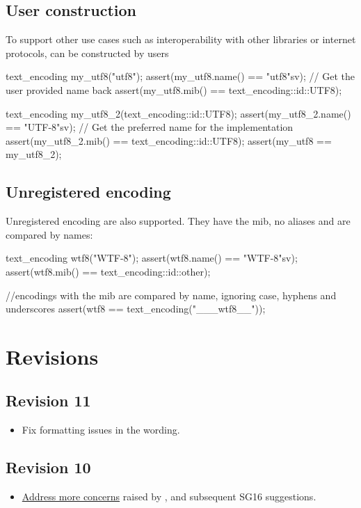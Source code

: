 \documentclass{wg21}
\begin{document}
\subsection{User construction}

To support other use cases such as interoperability with other libraries or internet protocols,
 can be constructed by users

\begin{colorblock}
text_encoding my_utf8("utf8");
assert(my_utf8.name() == "utf8"sv); // Get the user provided name back
assert(my_utf8.mib() == text_encoding::id::UTF8);

text_encoding my_utf8_2(text_encoding::id::UTF8);
assert(my_utf8_2.name() == "UTF-8"sv); // Get the preferred name for the implementation
assert(my_utf8_2.mib() == text_encoding::id::UTF8);
assert(my_utf8 == my_utf8_2);
\end{colorblock}

\subsection{Unregistered encoding}

Unregistered encoding are also supported. They have the  mib, no aliases and are compared
by names:

\begin{colorblock}
text_encoding wtf8("WTF-8");
assert(wtf8.name() == "WTF-8"sv);
assert(wtf8.mib() == text_encoding::id::other);

//encodings with the  mib are compared by name, ignoring case, hyphens and underscores
assert(wtf8 == text_encoding("___wtf8__"));
\end{colorblock}


\section{Revisions}

\subsection*{Revision 11}
\begin{itemize}
    \item Fix formatting issues in the wording.
\end{itemize}

\subsection*{Revision 10}
\begin{itemize}
\item \hyperref[P2498-concerns]{Address more concerns} raised by , and subsequent SG16 suggestions.
\end{itemize}
    
\end{document}
